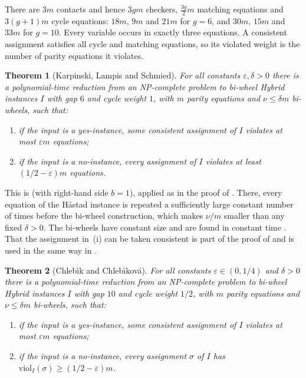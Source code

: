 \documentclass[11pt]{amsart}
\newtheorem{theorem}{Theorem}[section]
\theoremstyle{definition}
\theoremstyle{remark}
\numberwithin{equation}{section}
\newcommand{\eps}{\varepsilon}
\newcommand{\viol}{\mathrm{viol}}
\begin{document}
There are $3m$ contacts and hence $3gm$ checkers, $\frac{3g}{2}m$ matching equations and $3(g+1)m$ cycle equations: $18m$, $9m$ and $21m$ for $g=6$, and $30m$, $15m$ and $33m$ for $g=10$. Every variable occurs in exactly three equations. A consistent assignment satisfies all cycle and matching equations, so its violated weight is the number of parity equations it violates.

\begin{theorem}[Karpinski, Lampis and Schmied]\label{thm:hybrid}
For all constants $\eps,\delta>0$ there is a polynomial-time reduction from an NP-complete problem to bi-wheel Hybrid instances $I$ with gap $6$ and cycle weight $1$, with $m$ parity equations and $\nu\le\delta m$ bi-wheels, such that:
\begin{enumerate}[label=\textup{(\roman*)},leftmargin=2.2em]
\item if the input is a yes-instance, some consistent assignment of $I$ violates at most $\eps m$ equations;
\item if the input is a no-instance, every assignment of $I$ violates at least $(1/2-\eps)m$ equations.
\end{enumerate}
\end{theorem}

This is \cite[Theorem~3]{KLS15} (with right-hand side $b=1$), applied as in the proof of \cite[Theorem~5]{KLS15}. There, every equation of the H\aa{}stad instance is repeated a sufficiently large constant number of times before the bi-wheel construction, which makes $\nu/m$ smaller than any fixed $\delta>0$. The bi-wheels have constant size and are found in constant time \cite[proof of Theorem~3]{KLS15}. That the assignment in~(i) can be taken consistent is part of the proof of \cite[Theorem~3]{KLS15} and is used in the same way in \cite[Lemma~3]{KLS15}.

\begin{theorem}[Chleb\'{\i}k and Chleb\'{\i}kov\'a]\label{thm:ccsource}
For all constants $\eps\in(0,1/4)$ and $\delta>0$ there is a polynomial-time reduction from an NP-complete problem to bi-wheel Hybrid instances $I$ with gap $10$ and cycle weight $1/2$, with $m$ parity equations and $\nu\le\delta m$ bi-wheels, such that:
\begin{enumerate}[label=\textup{(\roman*)},leftmargin=2.2em]
\item if the input is a yes-instance, some consistent assignment of $I$ violates at most $\eps m$ equations;
\item if the input is a no-instance, every assignment $\sigma$ of $I$ has $\viol_I(\sigma)\ge(1/2-\eps)m$.
\end{enumerate}
\end{theorem}
\end{document}
